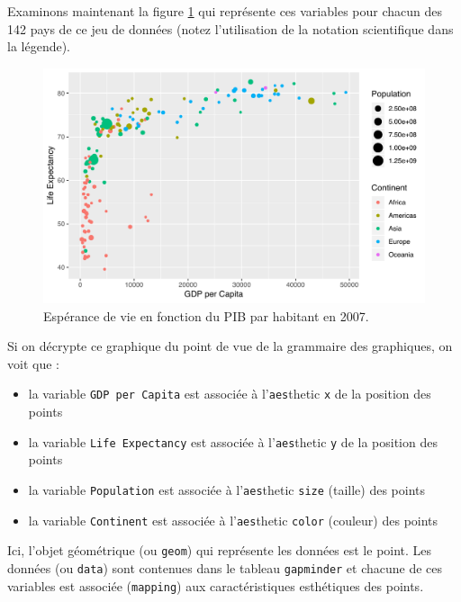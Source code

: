 \documentclass[a4paperpaper,]{article}
\providecommand{\tightlist}{%
  \setlength{\itemsep}{0pt}\setlength{\parskip}{0pt}}
\begin{document}
Examinons maintenant la figure \ref{fig:gapmind} qui représente ces variables pour chacun des 142 pays de ce jeu de données (notez l'utilisation de la notation scientifique dans la légende).

\begin{figure}[htpb]

{\centering \includegraphics[width=0.9\linewidth]{figure/gapmind-1} 

}

\caption{Espérance de vie en fonction du PIB par habitant en 2007.}\label{fig:gapmind}
\end{figure}

Si on décrypte ce graphique du point de vue de la grammaire des graphiques, on voit que :

\begin{itemize}
\tightlist
\item
  la variable \texttt{GDP\ per\ Capita} est associée à l'\texttt{aes}thetic \texttt{x} de la position des points
\item
  la variable \texttt{Life\ Expectancy} est associée à l'\texttt{aes}thetic \texttt{y} de la position des points
\item
  la variable \texttt{Population} est associée à l'\texttt{aes}thetic \texttt{size} (taille) des points
\item
  la variable \texttt{Continent} est associée à l'\texttt{aes}thetic \texttt{color} (couleur) des points
\end{itemize}

Ici, l'objet géométrique (ou \texttt{geom}) qui représente les données est le point. Les données (ou \texttt{data}) sont contenues dans le tableau \texttt{gapminder} et chacune de ces variables est associée (\texttt{mapping}) aux caractéristiques esthétiques des points.
\end{document}
